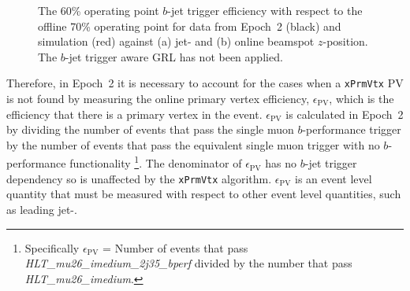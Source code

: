 \begin{figure}[!htb]
\begin{center}
  \captionsetup[subfigure]{aboveskip=0pt,justification=centering}
\end{center}
\vspace{-1em}
\caption[
  The $b$-jet trigger efficiency 
  for data from Epoch~2 and simulation against jet-\pT{} and online beamspot $z$-position.
  The $b$-jet trigger aware GRL has not been applied.]
        {
  The 60\% operating point $b$-jet trigger efficiency with respect to the offline 70\% operating point
  for data from Epoch~2 (black) and simulation (red) against (a) jet-\pT{} and (b) online beamspot $z$-position.
  The $b$-jet trigger aware GRL has not been applied.}
\label{fig:Epoch2_eff}
\end{figure}

Therefore, in Epoch~2 it is necessary to account for the cases when a \verb|xPrmVtx| PV is not found
by measuring the online primary vertex efficiency, $\epsilon_{\text{PV}}$,
which is the efficiency that there is a primary vertex in the event.
$\epsilon_{\text{PV}}$ is calculated in Epoch~2 by dividing the number of events that pass the single muon $b$-performance trigger
by the number of events that pass the equivalent single muon trigger with no $b$-performance functionality
\footnote{ Specifically $\epsilon_{\text{PV}}$ = Number of events that pass \textit{HLT\_mu26\_imedium\_2j35\_bperf} divided by the number that pass \textit{HLT\_mu26\_imedium}.}.
The denominator of $\epsilon_{\text{PV}}$ has no $b$-jet trigger dependency so is unaffected by the \verb|xPrmVtx| algorithm.
$\epsilon_{\text{PV}}$ is an event level quantity that must be measured with respect to other event level quantities, such as leading jet-\pT.


